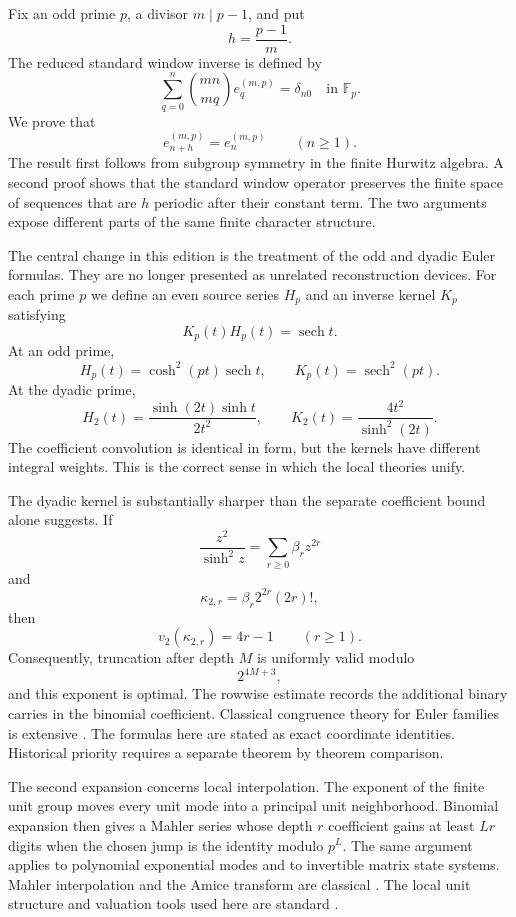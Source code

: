 \documentclass{aomart}
\theoremstyle{definition}
\theoremstyle{remark}
\newcommand{\FF}{\mathbb F}
\newcommand{\vTwo}{v_2}
\begin{document}
Fix an odd prime \(p\), a divisor \(m\mid p-1\), and put
\[
h=\frac{p-1}{m}.
\]
The reduced standard window inverse is defined by
\[
\sum_{q=0}^{n}
\binom{mn}{mq}e_q^{(m,p)}
=
\delta_{n0}
\quad\text{in }\FF_p.
\]
We prove that
\[
e_{n+h}^{(m,p)}=e_n^{(m,p)}
\qquad(n\geq1).
\]
The result first follows from subgroup symmetry in the finite Hurwitz algebra. A second proof shows that the standard window operator preserves the finite space of sequences that are \(h\) periodic after their constant term. The two arguments expose different parts of the same finite character structure.

The central change in this edition is the treatment of the odd and dyadic Euler formulas. They are no longer presented as unrelated reconstruction devices. For each prime \(p\) we define an even source series \(H_p\) and an inverse kernel \(K_p\) satisfying
\[
K_p(t)H_p(t)=\operatorname{sech}t.
\]
At an odd prime,
\[
H_p(t)=\cosh^2(pt)\operatorname{sech}t,
\qquad
K_p(t)=\operatorname{sech}^2(pt).
\]
At the dyadic prime,
\[
H_2(t)=\frac{\sinh(2t)\sinh t}{2t^2},
\qquad
K_2(t)=\frac{4t^2}{\sinh^2(2t)}.
\]
The coefficient convolution is identical in form, but the kernels have different integral weights. This is the correct sense in which the local theories unify.

The dyadic kernel is substantially sharper than the separate coefficient bound alone suggests. If
\[
\frac{z^2}{\sinh^2z}
=
\sum_{r\geq0}\beta_rz^{2r}
\]
and
\[
\kappa_{2,r}=\beta_r2^{2r}(2r)!,
\]
then
\[
\vTwo(\kappa_{2,r})=4r-1
\qquad(r\geq1).
\]
Consequently, truncation after depth \(M\) is uniformly valid modulo
\[
2^{4M+3},
\]
and this exponent is optimal. The rowwise estimate records the additional binary carries in the binomial coefficient. Classical congruence theory for Euler families is extensive \cite{CarlitzLevine1960,Young1999,Young2001,Sun2008,Chen2004}. The formulas here are stated as exact coordinate identities. Historical priority requires a separate theorem by theorem comparison.

The second expansion concerns local interpolation. The exponent of the finite unit group moves every unit mode into a principal unit neighborhood. Binomial expansion then gives a Mahler series whose depth \(r\) coefficient gains at least \(Lr\) digits when the chosen jump is the identity modulo \(p^L\). The same argument applies to polynomial exponential modes and to invertible matrix state systems. Mahler interpolation and the Amice transform are classical \cite{Mahler1958,Amice1964,Robert2000}. The local unit structure and valuation tools used here are standard \cite{Koblitz1984,Serre1979,Washington1997,Gouvea1997}.
\end{document}
